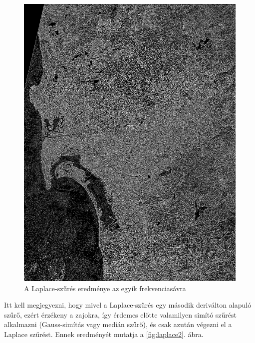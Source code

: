\documentclass[a4paper,12pt]{article}
\begin{document}
\begin{figure}
	\centering
	\includegraphics[width=12cm]{laplace1.png}
	\caption{A Laplace-szűrés eredménye az egyik frekvenciasávra}
	\label{fig:laplace1}
\end{figure}

Itt kell megjegyezni, hogy mivel a Laplace-szűrés egy második deriválton alapuló szűrő, ezért érzékeny a zajokra, így érdemes előtte valamilyen simító szűrést alkalmazni (Gauss-simítás vagy medián szűrő), és csak azután végezni el a Laplace szűrést. Ennek eredményét mutatja a \ref{fig:laplace2}. ábra.
\end{document}
